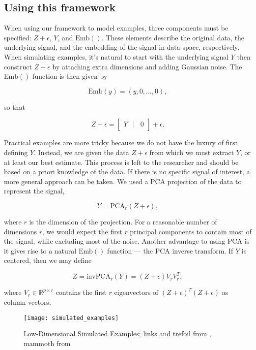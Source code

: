 \documentclass{article}
\begin{document}
\subsection{Using this framework}
When using our framework to model examples, three components must be specified: $Z + \epsilon$, $Y$, and $\textrm{Emb}()$. These elements describe the original data, the underlying signal, and the embedding of the signal in data space, respectively. When simulating examples, it's natural to start with the underlying signal $Y$ then construct $Z + \epsilon$ by attaching extra dimensions and adding Gaussian noise. The $\textrm{Emb}()$ function is then given by \begin{linenomath}$$\textrm{Emb}(y) = (y,0,\hdots,0),$$\end{linenomath} so that
\begin{linenomath}$$Z + \epsilon = \begin{bmatrix}
Y & \vert & 0
\end{bmatrix} + \epsilon.$$\end{linenomath}

Practical examples are more tricky because we do not have the luxury of first defining $Y$. Instead, we are given the data $Z + \epsilon$ from which we must extract $Y$, or at least our best estimate. This process is left to the researcher and should be based on a priori knowledge of the data. If there is no specific signal of interest, a more general approach can be taken. We used a PCA projection of the data to represent the signal, \begin{linenomath}$$Y = \textrm{PCA}_r(Z + \epsilon),$$\end{linenomath} where $r$ is the dimension of the projection. For a reasonable number of dimensions $r$, we would expect the first $r$ principal components to contain most of the signal, while excluding most of the noise. Another advantage to using PCA is it gives rise to a natural $\textrm{Emb}()$ function --- the PCA inverse transform. If $Y$ is centered, then we may define \begin{linenomath}$$Z = \textrm{invPCA}_r(Y) = (Z + \epsilon)V_rV_r^T,$$\end{linenomath} where $V_r \in \mathbb{R}^{p \times r}$ contains the first $r$ eigenvectors of $(Z+\epsilon)^T(Z+\epsilon)$ as column vectors.

\renewcommand{\thefigure}{2}
\begin{figure}[t]
\centering
\texttt{[image: simulated\_examples]}
\caption{Low-Dimensional Simulated Examples; links and trefoil from \cite{Distill}, mammoth from \cite{understanding DR}}
\end{figure}
\end{document}
